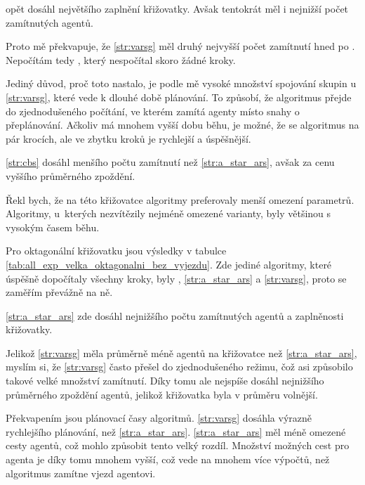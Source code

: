  opět dosáhl největšího zaplnění křižovatky.
Avšak tentokrát měl i nejnižší počet zamítnutých agentů.

Proto mě překvapuje, že \ref{str:varsg} měl druhý nejvyšší počet zamítnutí hned po .
Nepočítám tedy , který nespočítal skoro žádné kroky.

Jediný důvod, proč toto nastalo, je podle mě vysoké množství spojování skupin u \ref{str:varsg},
které vede k dlouhé době plánování.
To způsobí, že algoritmus přejde do zjednodušeného počítání, ve kterém zamítá agenty místo snahy o přeplánování.
Ačkoliv  má mnohem vyšší dobu běhu, je možné, že se algoritmus 
na pár krocích, ale ve zbytku kroků je rychlejší a úspěšnější.

\ref{str:cbs} dosáhl menšího počtu zamítnutí než \ref{str:a_star_ars}, avšak za cenu vyššího průměrného zpoždění.

Řekl bych, že na této křižovatce algoritmy preferovaly menší omezení parametrů.
Algoritmy, u~kterých nezvítězily nejméně omezené varianty, byly většinou s vysokým časem běhu.



Pro oktagonální křižovatku jsou výsledky v tabulce \ref{tab:all_exp_velka_oktagonalni_bez_vyjezdu}.
Zde jediné algoritmy, které úspěšně dopočítaly všechny kroky, byly
, \ref{str:a_star_ars} a \ref{str:varsg}, proto se zaměřím převážně na ně.

\ref{str:a_star_ars} zde dosáhl nejnižšího počtu zamítnutých agentů a zaplněnosti křižovatky.

Jelikož \ref{str:varsg} měla průměrně méně agentů na křižovatce než \ref{str:a_star_ars}, myslím si,
že \ref{str:varsg} často přešel do zjednodušeného režimu, čož asi způsobilo takové velké množství zamítnutí.
Díky tomu ale nejspíše dosáhl nejnižšího průměrného zpoždění agentů, jelikož křižovatka byla v průměru volnější.

Překvapením jsou plánovací časy algoritmů.
\ref{str:varsg} dosáhla výrazně rychlejšího plánování, než \ref{str:a_star_ars}.
\ref{str:a_star_ars} měl méně omezené cesty agentů, což mohlo způsobit tento velký rozdíl.
Množství možných cest pro agenta je díky tomu mnohem vyšší, což vede na mnohem více výpočtů,
než algoritmus zamítne vjezd agentovi.




